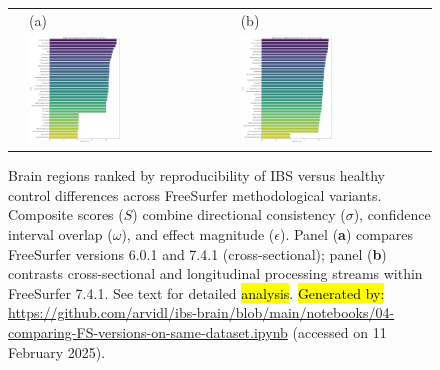 \documentclass[diagnostics,article,accept,pdftex,moreauthors]{Definitions/mdpi}
\begin{document}
\begin{figure}[H]
\begin{tabular}{llll}
 \hspace{-6mm} & (a) &  \hspace{-8mm}  & (b)  \\
\hspace{-17mm} & \includegraphics[width=0.50\textwidth]{figs/region_rankings_601_vs_741.png} & \hspace{-10mm} &  \includegraphics[width=0.50\textwidth]{figs/region_rankings_741_cross_vs_long.png}
\end{tabular}
\caption{{{Brain regions ranked by reproducibility of IBS versus healthy control differences across FreeSurfer methodological variants}}. {Composite scores} 
($S$) combine directional consistency ($\sigma$), confidence interval overlap ($\omega$), and effect magnitude ($\epsilon$). Panel (\textbf{a}) compares FreeSurfer versions 6.0.1 and 7.4.1 (cross-sectional); panel (\textbf{b}) contrasts cross-sectional and longitudinal processing streams within FreeSurfer 7.4.1. See text for detailed \hl{analysis}. %
{\hl{Generated by:} {{ \url{https://github.com/arvidl/ibs-brain/blob/main/notebooks/04-comparing-FS-versions-on-same-dataset.ipynb}}}} (accessed on 11 February 2025).}
\label{fig:region_rankings_601_vs_741_cross_vs_long}
\end{figure} 
\end{document}

